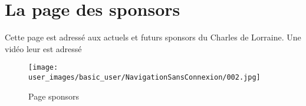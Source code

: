 \section{La page des sponsors}

Cette page est adressé aux actuels et futurs sponsors du Charles de Lorraine. Une vidéo leur est adressé

\begin{figure}[H]
\centering
\texttt{[image: user\_images/basic\_user/NavigationSansConnexion/002.jpg]}
\caption{Page sponsors}
\end{figure}
